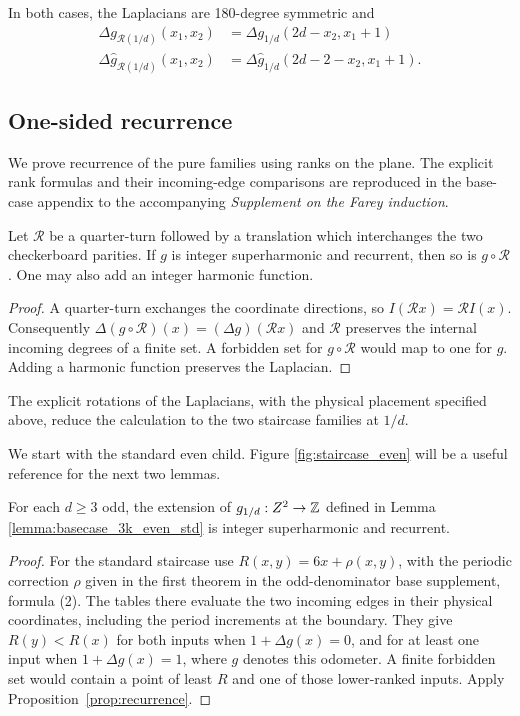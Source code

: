 \documentclass[12pt]{amsart}
\begin{document}
\begin{lemma}
	In both cases, the Laplacians are 180-degree symmetric and  
	\begin{align*}
	\Delta g_{\mathcal{R}(1/d)}(x_1,x_2) &= \Delta g_{1/d}(2d-x_2,x_1+1) \\
	\Delta \hat{g}_{\mathcal{R}(1/d)}(x_1,x_2) &= \Delta \hat{g}_{1/d}(2d-2-x_2,x_1+1).
	\end{align*}
	
	
	
\end{lemma}

\subsection{One-sided recurrence}
We prove recurrence of the pure families using ranks on the plane. The explicit rank formulas and their incoming-edge comparisons are reproduced in the base-case appendix to the accompanying \emph{Supplement on the Farey induction}.
\begin{lemma}\label{lemma:rot_recurrence_invariance}
Let $\mathcal R$ be a quarter-turn followed by a translation which interchanges the two checkerboard parities. If $g$ is integer superharmonic and recurrent, then so is $g\circ\mathcal R$. One may also add an integer harmonic function.
\end{lemma}
\begin{proof}
A quarter-turn exchanges the coordinate directions, so $I(\mathcal Rx)=\mathcal R I(x)$. Consequently $\Delta(g\circ\mathcal R)(x)=(\Delta g)(\mathcal Rx)$ and $\mathcal R$ preserves the internal incoming degrees of a finite set. A forbidden set for $g\circ\mathcal R$ would map to one for $g$. Adding a harmonic function preserves the Laplacian.
\end{proof}

The explicit rotations of the Laplacians, with the physical placement specified above, reduce the calculation to the two staircase families at $1/d$.

We start with the standard even child.  Figure \ref{fig:staircase_even} will be a useful 
reference for the next two lemmas. 

\begin{lemma} \label{lemma:staircase_recurrent}
For each $d \geq 3$ odd, the extension of $g_{1/d}:Z^2 \to \mathbb{Z}$ defined in Lemma \ref{lemma:basecase_3k_even_std}
is integer superharmonic and recurrent.  
\end{lemma}
\begin{proof}
For the standard staircase use $R(x,y)=6x+\rho(x,y)$, with the periodic correction $\rho$ given in the first theorem in the odd-denominator base supplement, formula (2). The tables there evaluate the two incoming edges in their physical coordinates, including the period increments at the boundary. They give $R(y)<R(x)$ for both inputs when $1+\Delta g(x)=0$, and for at least one input when $1+\Delta g(x)=1$, where $g$ denotes this odometer. A finite forbidden set would contain a point of least $R$ and one of those lower-ranked inputs. Apply Proposition~\ref{prop:recurrence}.
\end{proof}
\end{document}
